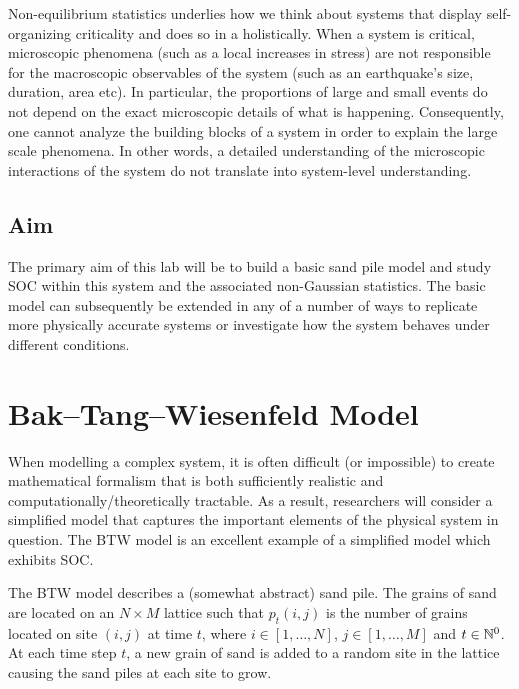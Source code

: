 \documentclass[
  a4paper,             %
  11pt,                %
  oneside,             %
  onecolumn,           %
  bibliography=totoc,  %
  final,               %
]{scrartcl}
\newcounter{question}
\begin{document}
Non-equilibrium statistics underlies how we think about systems that display
self-organizing criticality and does so in a holistically.  When a system is
critical, microscopic phenomena (such as a local increases in stress) are not
responsible for the macroscopic observables of the system (such as an
earthquake's size, duration, area etc).  In particular, the proportions of large
and small events do not depend on the exact microscopic details of what is
happening.  Consequently, one cannot analyze the building blocks of a system in
order to explain the large scale phenomena.  In other words, a detailed
understanding of the microscopic interactions of the system do not translate
into system-level understanding.

\subsection{Aim}
\label{subsec:aim}

The primary aim of this lab will be to build a basic sand pile model and study
\gls{SOC} within this system and the associated non-Gaussian statistics.  The
basic model can subsequently be extended in any of a number of ways to replicate
more physically accurate systems or investigate how the system behaves under
different conditions.

\cleardoublepage
\section{Bak--Tang--Wiesenfeld Model}
\label{sec:bkw_model}

When modelling a complex system, it is often difficult (or impossible) to create
mathematical formalism that is both sufficiently realistic and
computationally/theoretically tractable.  As a result, researchers will consider
a simplified model that captures the important elements of the physical system
in question.  The \gls{BTW} model is an excellent example of a simplified
model which exhibits \gls{SOC}.

The \gls{BTW} model describes a (somewhat abstract) sand pile.  The grains of
sand are located on an \(N \times M\) lattice such that \(p_{t}(i, j)\) is the
number of grains located on site \((i, j)\) at time \(t\), where \(i \in [1,
  \dots, N]\), \(j \in [1, \dots, M]\) and \(t \in\mathbb{N}^{0}\).  At each time step
\(t\), a new grain of sand is added to a random site in the lattice causing the
sand piles at each site to grow.
\end{document}
